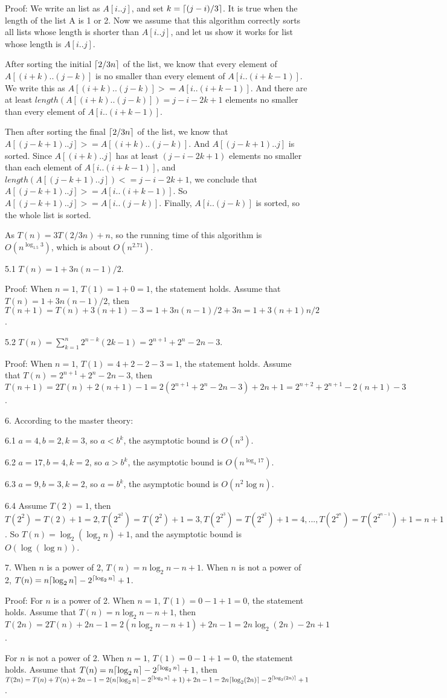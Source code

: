\documentclass[11pt]{article}
\DeclarePairedDelimiter\ceil{\lceil}{\rceil}
\begin{document}
Proof: We write an list as $A[i..j]$, and set $k=\ceil{(j-i)/3}$. It is true when the length of the list A is 1 or 2. Now we assume that this algorithm correctly sorts all lists whose length is shorter than $A[i..j]$, and let us show it works for list whose length is $A[i..j]$.

After sorting the initial $\ceil{2/3 n}$ of the list, we know that every element of $A[(i+k)..(j-k)]$ is no smaller than every element of  $A[i..(i+k-1)]$. We write this as $A[(i+k)..(j-k)] >= A[i..(i+k-1)]$. And there are at least $length(A[(i+k)..(j-k)]) = j-i-2k+1$ elements no smaller than every element of $ A[i..(i+k-1)] $.

Then after sorting the final $\ceil{2/3 n}$ of the list, we know that $ A[(j-k+1)..j] >= A[(i+k)..(j-k)] $. And $ A[(j-k+1)..j] $ is sorted. Since $A[(i+k)..j]$ has at least $(j-i-2k+1)$ elements no smaller than each element of $A[i..(i+k-1)]$, and $length(A[(j-k+1)..j]) <= j-i-2k+1$, we conclude that $A[(j-k+1)..j] >= A[i..(i+k-1)]$. So $A[(j-k+1)..j] >= A[i..(j-k)]$.
Finally, $A[i..(j-k)]$ is sorted, so the whole list is sorted.

As $T(n)=3T(2/3n)+n$, so the running time of this algorithm is $O(n^{\log_{1.5} 3})$, which is about $O(n^{2.71})$.

5.1 $T(n)=1+3n(n-1)/2$. 

Proof: When $n=1$, $T(1)=1+0=1$, the statement holds. Assume that $T(n)=1+3n(n-1)/2$, then $T(n+1)=T(n)+3(n+1)-3=1+3n(n-1)/2+3n=1+3(n+1)n/2$.
 
5.2 $T(n) = \sum_{k=1}^{n} {2^{n-k} (2k-1)} = 2^{n+1}+2^n-2n-3 $. 

Proof: When $n=1$, $T(1)=4+2-2-3=1$, the statement holds. Assume that $ T(n) = 2^{n+1}+2^n-2n-3 $, then $T(n+1)=2T(n)+2(n+1)-1 = 2(2^{n+1}+2^n-2n-3)+2n+1 = 2^{n+2}+2^{n+1}-2(n+1)-3 $.

6. According to the master theory:

6.1 $a=4, b=2, k=3$, so $a<b^k$, the asymptotic bound is $O(n^3)$.

6.2 $a=17, b=4, k=2$, so $a>b^k$, the asymptotic bound is $O(n^{ \log_{4}17})$.

6.3 $a=9, b=3, k=2$, so $a=b^k$, the asymptotic bound is $O(n^2 \log n)$.

6.4 Assume $T(2)=1$, then $T(2^2)=T(2)+1=2, T(2^{2^2})=T(2^2)+1=3, T(2^{2^3})=T(2^{2^2})+1=4, ... , T(2^{2^n})=T(2^{2^{n-1}})+1=n+1$. So $T(n)=\log_{2}(\log_{2}n)+1$, and the asymptotic bound is $O(\log(\log n))$.

7. When $n$ is a power of 2, $T(n)=n\log_{2}n-n+1$. When $n$ is not a power of 2, $T(n)=n \ceil{\log_{2}n} - 2^{\ceil{\log_{2}n}} +1$.

Proof: For $n$ is a power of 2. When $n=1$, $T(1)=0-1+1=0$, the statement holds. Assume that $T(n)=n\log_{2}n-n+1$, then $T(2n)=2T(n)+2n-1=2(n\log_{2}n-n+1)+2n-1=2n \log_{2} (2n) - 2n +1$.

For $n$ is not a power of 2. When $n=1$, $T(1)=0-1+1=0$, the statement holds. Assume that $T(n)=n \ceil{\log_{2}n} - 2^{\ceil{\log_{2}n}} +1$, then $T(2n)=T(n)+T(n)+2n-1=2(n \ceil{\log_{2}n} - 2^{\ceil{\log_{2}n}} +1)+2n -1=2n \ceil{\log_{2}(2n)} - 2^{\ceil{\log_{2}(2n)}} +1$.
\end{document}
